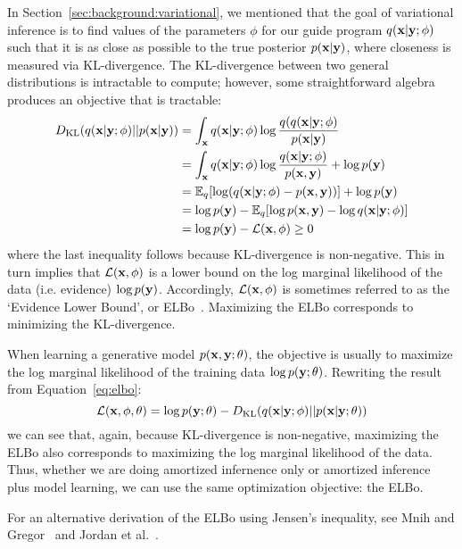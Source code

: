 In Section~\ref{sec:background:variational}, we mentioned that the goal of variational inference is to find values of the parameters $\phi$ for our guide program $q(\mathbf{x} | \mathbf{y} ; \phi)$ such that it is as close as possible to the true posterior $p(\mathbf{x} | \mathbf{y})$, where closeness is measured via KL-divergence. The KL-divergence between two general distributions is intractable to compute; however, some straightforward algebra produces an objective that is tractable:
\begin{align}
\begin{split}
D_{\text{KL}}(q(\mathbf{x} | \mathbf{y} ; \phi) || p(\mathbf{x} | \mathbf{y}))
&= \int_{\mathbf{x}} q(\mathbf{x} | \mathbf{y} ; \phi) \log \frac{q(q(\mathbf{x} | \mathbf{y} ; \phi)}{p(\mathbf{x} | \mathbf{y})}\\
&= \int_{\mathbf{x}} q(\mathbf{x} | \mathbf{y} ; \phi) \log \frac{q(\mathbf{x} | \mathbf{y} ; \phi)}{p(\mathbf{x}, \mathbf{y})} + \log p(\mathbf{y})\\
&= \mathbb{E}_{q}[ \log(q(\mathbf{x} | \mathbf{y} ; \phi) -  p(\mathbf{x}, \mathbf{y}) ) ] + \log p(\mathbf{y})\\
&= \log p(\mathbf{y}) - \mathbb{E}_{q}[ \log p(\mathbf{x}, \mathbf{y}) - \log q(\mathbf{x} | \mathbf{y} ; \phi) ]\\
&= \log p(\mathbf{y}) - \mathcal{L}(\mathbf{x}, \phi) \geq 0
\end{split}
\label{eq:elbo}
\end{align}
where the last inequality follows because KL-divergence is non-negative. This in turn implies that $\mathcal{L}(\mathbf{x}, \phi)$ is a lower bound on the log marginal likelihood of the data (i.e. evidence) $\log p(\mathbf{y})$. Accordingly, $\mathcal{L}(\mathbf{x}, \phi)$ is sometimes referred to as the `Evidence Lower Bound', or ELBo~\cite{BBVI}. Maximizing the ELBo corresponds to minimizing the KL-divergence.

When learning a generative model $p(\mathbf{x}, \mathbf{y}; \theta)$, the objective is usually to maximize the log marginal likelihood of the training data $\log p(\mathbf{y} ; \theta)$. Rewriting the result from Equation~\ref{eq:elbo}:
\begin{equation*}
\mathcal{L}(\mathbf{x}, \phi, \theta) = \log p(\mathbf{y} ; \theta) - D_{\text{KL}}(q(\mathbf{x} | \mathbf{y} ; \phi) || p(\mathbf{x} | \mathbf{y} ; \theta))
\end{equation*}
we can see that, again, because KL-divergence is non-negative, maximizing the ELBo also corresponds to maximizing the log marginal likelihood of the data. Thus, whether we are doing amortized infernence only or amortized inference plus model learning, we can use the same optimization objective: the ELBo.

For an alternative derivation of the ELBo using Jensen's inequality, see Mnih and Gregor~\cite{NVIL} and Jordan et al.~\cite[p. 213]{VariationalInference}.

